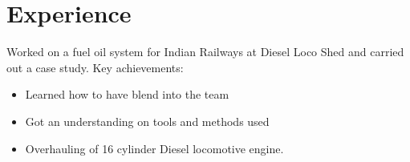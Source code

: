 \section{Experience}

{Worked on a fuel oil system for Indian Railways at Diesel Loco Shed and carried out a case study.
\newline{}\newline{}
Key achievements:
\begin{itemize}
\item Learned how to have blend into the team
\item Got an understanding on tools and methods used
\item Overhauling of 16 cylinder Diesel locomotive engine.
\end{itemize}}